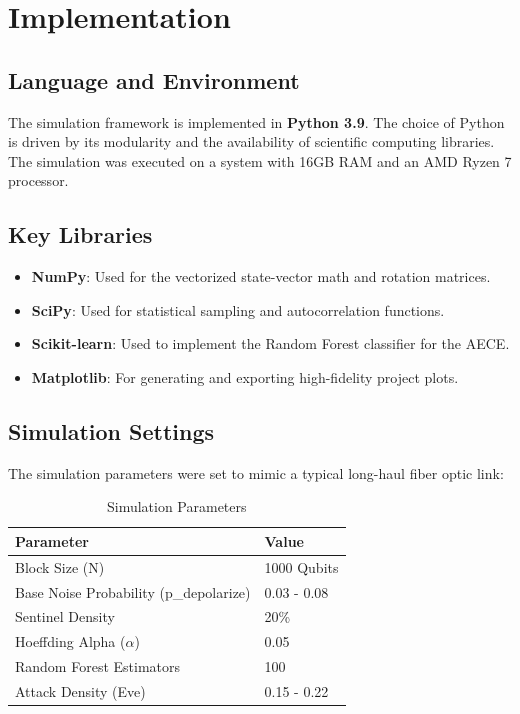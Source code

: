 \documentclass[journal,onecolumn,12pt,draftclsnofoot]{IEEEtran}
\begin{document}
\section{Implementation}

\subsection{Language and Environment}
The simulation framework is implemented in \textbf{Python 3.9}. The choice of Python is driven by its modularity and the availability of scientific computing libraries. The simulation was executed on a system with 16GB RAM and an AMD Ryzen 7 processor.

\subsection{Key Libraries}
\begin{itemize}
    \item \textbf{NumPy}: Used for the vectorized state-vector math and rotation matrices.
    \item \textbf{SciPy}: Used for statistical sampling and autocorrelation functions.
    \item \textbf{Scikit-learn}: Used to implement the Random Forest classifier for the AECE.
    \item \textbf{Matplotlib}: For generating and exporting high-fidelity project plots.
\end{itemize}

\subsection{Simulation Settings}
The simulation parameters were set to mimic a typical long-haul fiber optic link:
\begin{table}[h]
\centering
\caption{Simulation Parameters}
\begin{tabular}{ll}
\toprule
\textbf{Parameter} & \textbf{Value} \\
\midrule
Block Size (N) & 1000 Qubits \\
Base Noise Probability (p\_depolarize) & 0.03 - 0.08 \\
Sentinel Density & 20\% \\
Hoeffding Alpha ($\alpha$) & 0.05 \\
Random Forest Estimators & 100 \\
Attack Density (Eve) & 0.15 - 0.22 \\
\bottomrule
\end{tabular}
\end{table}
\end{document}
